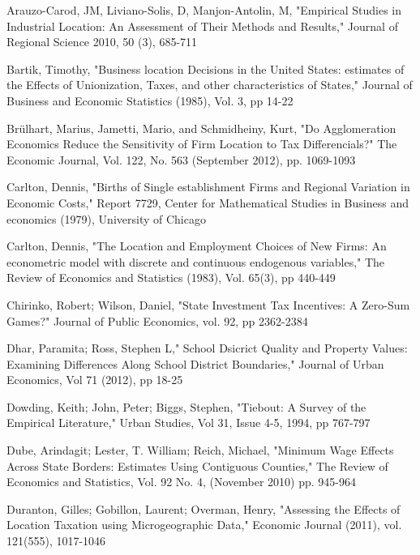 \documentclass[12pt,a4paper]{article}
\begin{document}
\newpage
\begin{thebibliography}{99}

Arauzo-Carod, JM, Liviano-Solis, D, Manjon-Antolin, M, "Empirical Studies in Industrial Location: An Assessment of Their Methods and Results," Journal of Regional Science 2010, 50 (3), 685-711

Bartik, Timothy, "Business location Decisions in the United States: estimates of the Effects of Unionization, Taxes, and other characteristics of States," Journal of Business and Economic Statistics (1985), Vol. 3, pp 14-22

Brülhart, Marius, Jametti, Mario, and Schmidheiny, Kurt, "Do Agglomeration Economics Reduce the Sensitivity of Firm Location to Tax Differencials?" The Economic Journal, Vol. 122, No. 563 (September 2012), pp. 1069-1093

Carlton, Dennis, "Births of Single establishment Firms and Regional Variation in Economic Costs," Report 7729, Center for Mathematical Studies in Business and economics (1979), University of Chicago

Carlton, Dennis, "The Location and Employment Choices of New Firms: An econometric model with discrete and continuous endogenous variables," The Review of Economics and Statistics (1983), Vol. 65(3), pp 440-449

Chirinko, Robert; Wilson, Daniel, "State Investment Tax Incentives: A Zero-Sum Games?" Journal of Public Economics, vol. 92, pp 2362-2384

Dhar, Paramita; Ross, Stephen L," School Dsicrict Quality and Property Values: Examining Differences Along School District Boundaries," Journal of Urban Economics, Vol 71 (2012), pp 18-25

Dowding, Keith; John, Peter; Biggs, Stephen, "Tiebout: A Survey of the Empirical Literature," Urban Studies, Vol 31, Issue 4-5, 1994, pp 767-797

Dube, Arindagit; Lester, T. William; Reich, Michael, "Minimum Wage Effects Across State Borders: Estimates Using Contiguous Counties," The Review of Economics and Statistics, Vol. 92 No. 4, (November 2010) pp. 945-964

Duranton, Gilles; Gobillon, Laurent; Overman, Henry, "Assessing the Effects of Location Taxation using Microgeographic Data," Economic Journal (2011), vol. 121(555), 1017-1046



\end{thebibliography}
\end{document}
